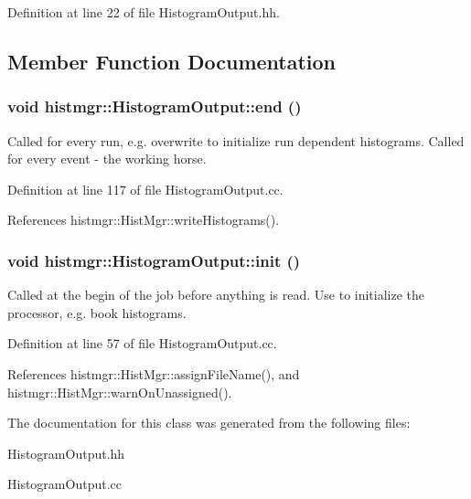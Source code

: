Definition at line 22 of file HistogramOutput.hh.

\subsection{Member Function Documentation}
\subsubsection[{end}]{\setlength{\rightskip}{0pt plus 5cm}void histmgr::HistogramOutput::end ()}\label{classhistmgr_1_1HistogramOutput_ae9d8650a0e3d0608fa1fa86849ab48ad}


Called for every run, e.g. overwrite to initialize run dependent histograms. Called for every event -\/ the working horse. 

Definition at line 117 of file HistogramOutput.cc.

References histmgr::HistMgr::writeHistograms().
\subsubsection[{init}]{\setlength{\rightskip}{0pt plus 5cm}void histmgr::HistogramOutput::init ()}\label{classhistmgr_1_1HistogramOutput_a191f76c80a79ad920e2e209426e7c2fe}


Called at the begin of the job before anything is read. Use to initialize the processor, e.g. book histograms. 

Definition at line 57 of file HistogramOutput.cc.

References histmgr::HistMgr::assignFileName(), and histmgr::HistMgr::warnOnUnassigned().

The documentation for this class was generated from the following files:\begin{DoxyCompactItemize}
\item 
HistogramOutput.hh\item 
HistogramOutput.cc\end{DoxyCompactItemize}
